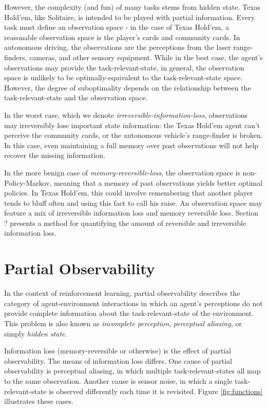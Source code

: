 \documentclass{article} %
\theoremstyle{definition}
\begin{document}
However, the complexity (and fun) of many tasks stems from hidden
state. Texas Hold'em, like Solitaire, is intended to be played with
partial information. Every task must define an observation space - in
the case of Texas Hold'em, a reasonable observation space is the
player's cards and community cards. In autonomous driving, the
observations are the perceptions from the laser range-finders,
cameras, and other sensory equipment. While in the best case, the
agent's observations may provide the task-relevant-state, in general,
the observation space is unlikely to be optimally-equivalent to the
task-relevant-state space. However, the degree of suboptimality
depends on the relationship between the task-relevant-state and the
observation space.

In the worst case, which we denote
\textit{irreversible-information-loss}, observations may irreversibly
lose important state information: the Texas Hold'em agent can't
perceive the community cards, or the autonomous vehicle's range-finder
is broken. In this case, even maintaining a full memory over past
observations will not help recover the missing information.

In the more benign case of \textit{memory-reversible-loss}, the
observation space is non-Policy-Markov, meaning that a memory of past
observations yields better optimal policies. In Texas Hold'em, this
could involve remembering that another player tends to bluff often and
using this fact to call his raise. An observation space may feature a
mix of irreversible information loss and memory reversible
loss. Section ? presents a method for quantifying the amount of
reversible and irreversible information loss.

\section{Partial Observability}
In the context of reinforcement learning, partial observability
describes the category of agent-environment interactions in which an
agent's perceptions do not provide complete information about the
task-relevant-state of the environment. This problem is also known as
\textit{incomplete perception}, \textit{perceptual aliasing}, or
simply \textit{hidden state}.

Information loss (memory-reversible or otherwise) is the effect of
partial observability. The means of information loss differs. One
cause of partial observability is perceptual aliasing, in which
multiple task-relevant-states all map to the same observation. Another
cause is sensor noise, in which a single task-relevant-state is
observed differently each time it is revisited. Figure
\ref{fig:functions} illustrates these cases.
\end{document}
